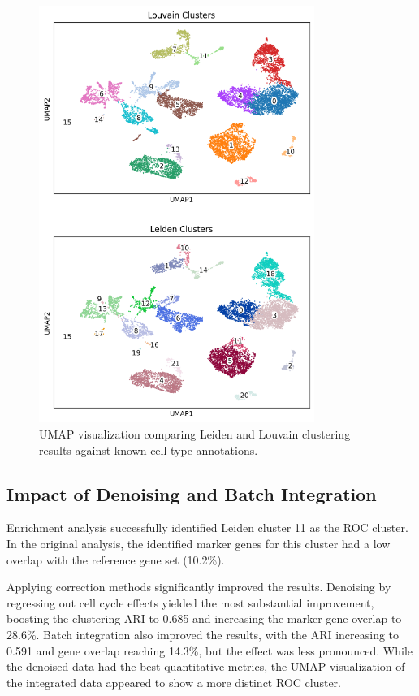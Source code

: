 \documentclass[12pt,letterpaper]{article}
\begin{document}
\begin{figure}[H]
    \centering
    \includegraphics[width=0.8\textwidth]{figures/leiden_louvain_clusters.png}
    \caption{UMAP visualization comparing Leiden and Louvain clustering results against known cell type annotations.}
    \label{fig:clustering}
\end{figure}

\subsection{Impact of Denoising and Batch Integration}
Enrichment analysis successfully identified Leiden cluster 11 as the ROC cluster. In the original analysis, the identified marker genes for this cluster had a low overlap with the reference gene set (10.2\%).

Applying correction methods significantly improved the results. Denoising by regressing out cell cycle effects yielded the most substantial improvement, boosting the clustering ARI to 0.685 and increasing the marker gene overlap to 28.6\%. Batch integration also improved the results, with the ARI increasing to 0.591 and gene overlap reaching 14.3\%, but the effect was less pronounced. While the denoised data had the best quantitative metrics, the UMAP visualization of the integrated data appeared to show a more distinct ROC cluster.
\end{document}
